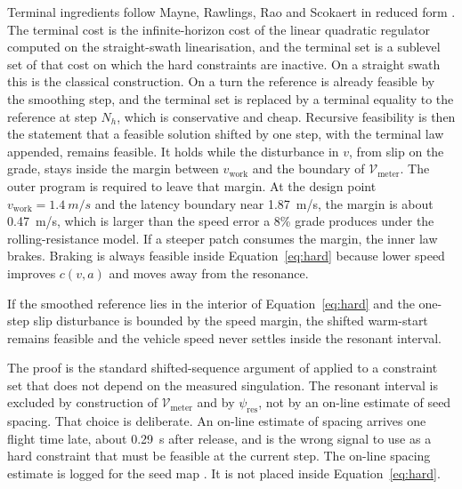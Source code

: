 Terminal ingredients follow Mayne, Rawlings, Rao and Scokaert in reduced form \cite{mayne2000}. The terminal cost is the infinite-horizon cost of the linear quadratic regulator computed on the straight-swath linearisation, and the terminal set is a sublevel set of that cost on which the hard constraints are inactive. On a straight swath this is the classical construction. On a turn the reference is already feasible by the smoothing step, and the terminal set is replaced by a terminal equality to the reference at step \(N_h\), which is conservative and cheap. Recursive feasibility is then the statement that a feasible solution shifted by one step, with the terminal law appended, remains feasible. It holds while the disturbance in \(v\), from slip on the grade, stays inside the margin between \(v_{\mathrm{work}}\) and the boundary of \(\mathcal{V}_{\mathrm{meter}}\). The outer program is required to leave that margin. At the design point \(v_{\mathrm{work}}=\SI{1.4}{m/s}\) and the latency boundary near \SI{1.87}{m/s}, the margin is about \SI{0.47}{m/s}, which is larger than the speed error a \num{8}\% grade produces under the rolling-resistance model. If a steeper patch consumes the margin, the inner law brakes. Braking is always feasible inside Equation~\eqref{eq:hard} because lower speed improves \(c(v,a)\) and moves away from the resonance.

\begin{proposition}
\label{prop:feas}
If the smoothed reference lies in the interior of Equation~\eqref{eq:hard} and the one-step slip disturbance is bounded by the speed margin, the shifted warm-start remains feasible and the vehicle speed never settles inside the resonant interval.
\end{proposition}

The proof is the standard shifted-sequence argument of \cite{mayne2000} applied to a constraint set that does not depend on the measured singulation. The resonant interval is excluded by construction of \(\mathcal{V}_{\mathrm{meter}}\) and by \(\psi_{\mathrm{res}}\), not by an on-line estimate of seed spacing. That choice is deliberate. An on-line estimate of spacing arrives one flight time late, about \SI{0.29}{s} after release, and is the wrong signal to use as a hard constraint that must be feasible at the current step. The on-line spacing estimate is logged for the seed map \cite{griepentrog2005,ehsani2004}. It is not placed inside Equation~\eqref{eq:hard}.

